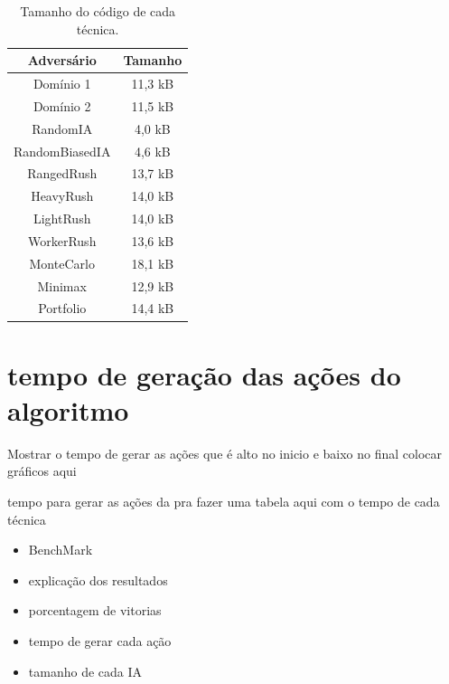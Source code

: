 \begin{table}[ht]
	\centering
	\caption{Tamanho  do código de cada técnica.}
	\label{tab:tamanho}
	\begin{tabular}{|c|c|}
		\hline
		\textbf{Adversário} & \textbf{Tamanho} \\ \hline
		Domínio 1           & 11,3 kB          \\ \hline
		Domínio 2           & 11,5 kB          \\ \hline
		RandomIA            & 4,0 kB           \\ \hline
		RandomBiasedIA      & 4,6 kB           \\ \hline
		RangedRush          & 13,7 kB          \\ \hline
		HeavyRush           & 14,0 kB          \\ \hline
		LightRush           & 14,0 kB          \\ \hline
		WorkerRush          & 13,6 kB          \\ \hline
		MonteCarlo          & 18,1 kB          \\ \hline
		Minimax             & 12,9 kB          \\ \hline
		Portfolio           & 14,4 kB          \\ \hline
	\end{tabular}
\end{table}

\section{tempo de geração das ações do algoritmo}

Mostrar o tempo de gerar as ações que é alto no inicio e baixo no final
colocar gráficos aqui 


tempo para gerar as ações
da pra fazer uma tabela aqui com o tempo de cada técnica



\begin{itemize}
	\item BenchMark
	\item explicação dos resultados
	\item porcentagem de vitorias
	\item tempo de gerar cada ação
	\item tamanho de cada IA	
\end{itemize}

